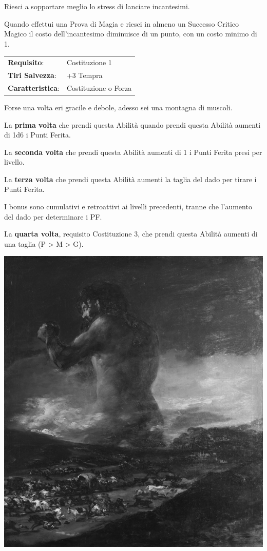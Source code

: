 \begin{multicols}{2}
Riesci a sopportare meglio lo stress di lanciare incantesimi.

Quando effettui una Prova di Magia e riesci in almeno un Successo Critico Magico il costo dell'incantesimo diminuisce di un punto, con un costo minimo di 1.

\hspace{-0.2cm}\begin{tabularx}{\linewidth}{l@{\hspace{8pt}}X}
\rowcolor{gray!20}\textbf{Requisito}: & Costituzione 1\\
\textbf{Tiri Salvezza}: & +3 Tempra\\
\rowcolor{gray!20}\textbf{Caratteristica}: & Costituzione o Forza\\
\end{tabularx}\smallskip

Forse una volta eri gracile e debole, adesso sei una montagna di muscoli.

La \textbf{prima volta} che prendi questa Abilità quando prendi questa Abilità aumenti di 1d6 i Punti Ferita.

La \textbf{seconda volta} che prendi questa Abilità aumenti di 1 i Punti Ferita presi per livello.

La \textbf{terza volta} che prendi questa Abilità aumenti la taglia del dado per tirare i Punti Ferita.

I bonus sono cumulativi e retroattivi ai livelli precedenti, tranne che l'aumento del dado per determinare i PF.

La \textbf{quarta volta}, requisito Costituzione 3, che prendi questa Abilità aumenti di una taglia (P > M > G).


\begin{center}
	\includegraphics[width=0.65\linewidth]{immagini/elcolosso.png}


\end{center}
\end{multicols}
